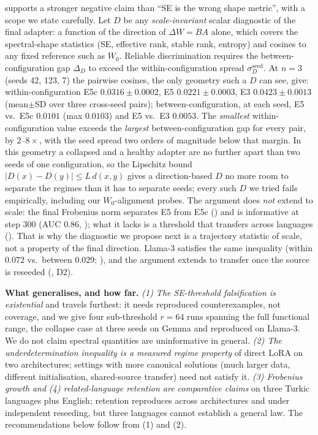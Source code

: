 \documentclass[11pt]{article}
\begin{document}
 supports a stronger negative claim than ``SE is the wrong shape metric'', with a scope we state carefully. Let $D$ be any \emph{scale-invariant} scalar diagnostic of the final adapter: a function of the direction of $\Delta W{=}BA$ alone, which covers the spectral-shape statistics (SE, effective rank, stable rank, entropy) and cosines to any fixed reference such as $W_0$. Reliable discrimination requires the between-configuration gap $\Delta_D$ to exceed the within-configuration spread $\sigma_D^{\text{seed}}$. At $n{=}3$ (seeds 42, 123, 7) the pairwise cosines, the only geometry such a $D$ can see, give: within-configuration E5c $0.0316{\pm}0.0002$, E5 $0.0221{\pm}0.0003$, E3 $0.0423{\pm}0.0013$ (mean${\pm}$SD over three cross-seed pairs); between-configuration, at each seed, E5 vs.\ E5c $0.0101$ (max $0.0103$) and E5 vs.\ E3 $0.0053$. The \emph{smallest} within-configuration value exceeds the \emph{largest} between-configuration gap for every pair, by $2$--$8\times$, with the seed spread two orders of magnitude below that margin. In this geometry a collapsed and a healthy adapter are no further apart than two seeds of one configuration, so the Lipschitz bound $|D(x)-D(y)| \le L\,d(x,y)$ gives a direction-based $D$ no more room to separate the regimes than it has to separate seeds; every such $D$ we tried fails empirically, including our $W_0$-alignment probes. The argument does \emph{not} extend to scale: the final Frobenius norm separates E5 from E5c () and is informative at step 300 (AUC $0.86$, ); what it lacks is a threshold that transfers across languages (). That is why the diagnostic we propose next is a trajectory statistic of scale, not a property of the final direction. Llama-3 satisfies the same inequality (within $0.072$ vs.\ between $0.029$; ), and the argument extends to transfer once the source is reseeded (, D2).

\textbf{What generalises, and how far.} \emph{(1) The SE-threshold falsification is existential} and travels furthest: it needs reproduced counterexamples, not coverage, and we give four sub-threshold $r{=}64$ runs spanning the full functional range, the collapse case at three seeds on Gemma and reproduced on Llama-3. We do not claim spectral quantities are uninformative in general. \emph{(2) The underdetermination inequality is a measured regime property} of direct LoRA on two architectures; settings with more canonical solutions (much larger data, different initialisation, shared-source transfer) need not satisfy it. \emph{(3) Frobenius growth and (4) related-language retention are comparative claims} on three Turkic languages plus English; retention reproduces across architectures and under independent reseeding, but three languages cannot establish a general law. The recommendations below follow from (1) and (2).
\end{document}
